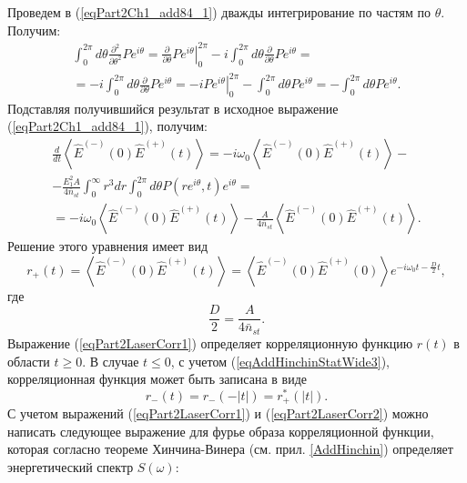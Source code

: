 Проведем в (\ref{eqPart2Ch1_add84_1}) дважды интегрирование по частям
по $\theta$. Получим:
\begin{eqnarray}
\int_0^{2 \pi}
d \theta
\frac{\partial^2}{\partial \theta^2}P e^{i \theta} = 
\left.\frac{\partial}{\partial \theta}P e^{i \theta}\right|_0^{2 \pi}
- 
i \int_0^{2 \pi}
d \theta
\frac{\partial}{\partial \theta}P e^{i \theta} = 
\nonumber \\
= - i \int_0^{2 \pi}
d \theta
\frac{\partial}{\partial \theta}P e^{i \theta}  
= 
- i \left.P e^{i \theta}\right|_0^{2 \pi}
-
\int_0^{2 \pi}
d \theta
P e^{i \theta} = 
- \int_0^{2 \pi}
d \theta
P e^{i \theta}.
\nonumber
\end{eqnarray}
Подставляя получившийся результат в исходное выражение
(\ref{eqPart2Ch1_add84_1}), получим:
\begin{eqnarray}
\frac{d}{dt}\left<\hat{E}^{(-)}\left(0\right)\hat{E}^{(+)}\left(t\right)\right>
=
-i \omega_0
\left<\hat{E}^{(-)}\left(0\right)\hat{E}^{(+)}\left(t\right)\right>-
\nonumber \\
-
\frac{E_1^2 A}{4 \bar{n}_{st}} 
\int_0^{\infty}r^3 d r 
\int_0^{2 \pi}
d \theta
P\left(r
e^{i \theta}, t\right) e^{i \theta} = 
\nonumber \\
=-i \omega_0
\left<\hat{E}^{(-)}\left(0\right)\hat{E}^{(+)}\left(t\right)\right> -
\frac{A}{4 \bar{n}_{st}}\left<\hat{E}^{(-)}\left(0\right)\hat{E}^{(+)}\left(t\right)\right>.
\nonumber
\end{eqnarray}
Решение этого уравнения имеет вид
\begin{equation}
r_{+}\left(t\right) = \left<\hat{E}^{(-)}\left(0\right)\hat{E}^{(+)}\left(t\right)\right> =
\left<\hat{E}^{(-)}\left(0\right)\hat{E}^{(+)}\left(0\right)\right>
e^{-i \omega_0 t - \frac{D}{2}t},
\label{eqPart2LaserCorr1}
\end{equation}
где
\[
\frac{D}{2} = \frac{A}{4 \bar{n}_{st}}.
\]
Выражение (\ref{eqPart2LaserCorr1}) определяет корреляционную функцию
$r\left(t\right)$ в области $t \ge 0$. В случае $t \le 0$, с учетом
(\ref{eqAddHinchinStatWide3}), корреляционная функция может быть
записана в виде  
\begin{equation}
r_{-}\left(t\right) = r_{-}\left(-\left|t\right|\right) =
r_{+}^{*}\left(\left|t\right|\right). 
\label{eqPart2LaserCorr2}
\end{equation}
С учетом выражений (\ref{eqPart2LaserCorr1}) и
(\ref{eqPart2LaserCorr2}) можно написать следующее выражение для фурье
образа корреляционной функции, которая согласно теореме Хинчина-Винера
(см. прил. \ref{AddHinchin})
определяет энергетический спектр $S\left(\omega\right)$:
